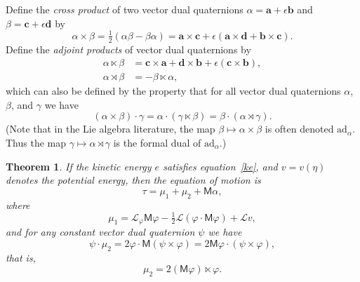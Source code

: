 \documentclass[reqno,12pt]{amsart}
\newcommand{\liederiv}{\mathcal L}
\newtheorem{theorem}{Theorem}
\begin{document}
Define the \emph{cross product} of two vector dual quaternions $\alpha = \bm a + \epsilon \bm b$ and $\beta = \bm c + \epsilon \bm d$ by
\begin{equation}
\alpha \times \beta = \tfrac12(\alpha \beta - \beta \alpha) = \bm a \times \bm c + \epsilon (\bm a \times \bm d + \bm b \times \bm c) .
\end{equation}
Define the \emph{adjoint products} of vector dual quaternions by
\begin{align}
\label{ltimes}
\alpha \ltimes \beta &= \bm c \times \bm a + \bm d \times \bm b + \epsilon (\bm c \times \bm b) ,\\
\alpha \rtimes \beta &= - \beta \ltimes \alpha ,
\end{align}
which can also be defined by the property that for all vector dual quaternions $\alpha$, $\beta$, and $\gamma$ we have
\begin{equation}
(\alpha \times \beta) \cdot \gamma = \alpha \cdot (\gamma \ltimes \beta) = \beta \cdot (\alpha \rtimes \gamma ).
\end{equation}
(Note that in the Lie algebra literature, the map $\beta \mapsto \alpha \times \beta$ is often denoted $\text{ad}_\alpha$.  Thus the map $\gamma \mapsto \alpha \rtimes \gamma$ is the formal dual of $\text{ad}_\alpha$.)


\begin{theorem}
\label{euler-lagrange}
If the kinetic energy $e$ satisfies equation~\eqref{ke}, and $v = v(\eta)$ denotes the potential energy, then the equation of motion is
\begin{equation}
\label{tau M gamma}
\tau = \mu_1 + \mu_2 + \mathsf M \alpha,
\end{equation}
where
\begin{equation}
\mu_1 = \liederiv_\varphi \mathsf M \varphi - \tfrac12 \liederiv(\varphi \cdot \mathsf M \varphi) + \liederiv v, 
\end{equation}
and for any constant vector dual quaternion $\psi$ we have
\begin{equation}
\psi \cdot \mu_2 = 2 \varphi \cdot \mathsf M (\psi \times \varphi) = 2 \mathsf M \varphi \cdot (\psi \times \varphi),
\end{equation}
that is,
\begin{equation}
\label{formula mu_2}
\mu_2 = 2 (\mathsf M \varphi) \ltimes \varphi .
\end{equation}
\end{theorem}
\end{document}
